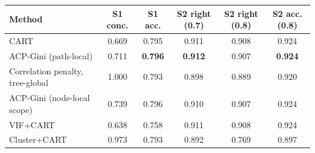 \begin{tabular}{lccccc}
\toprule
Method & S1 conc. & S1 acc. & S2 right (0.7) & S2 right (0.8) & S2 acc. (0.8) \\
\midrule
CART & 0.669 & 0.795 & 0.911 & 0.908 & 0.924 \\
ACP-Gini (path-local) & 0.711 & \textbf{0.796} & \textbf{0.912} & 0.907 & \textbf{0.924} \\
Correlation penalty, tree-global & 1.000 & 0.793 & 0.898 & 0.889 & 0.920 \\
ACP-Gini (node-local scope) & 0.739 & 0.796 & 0.910 & 0.907 & 0.924 \\
VIF+CART & 0.638 & 0.758 & 0.911 & 0.908 & 0.924 \\
Cluster+CART & 0.973 & 0.793 & 0.892 & 0.769 & 0.897 \\
\bottomrule
\end{tabular}

